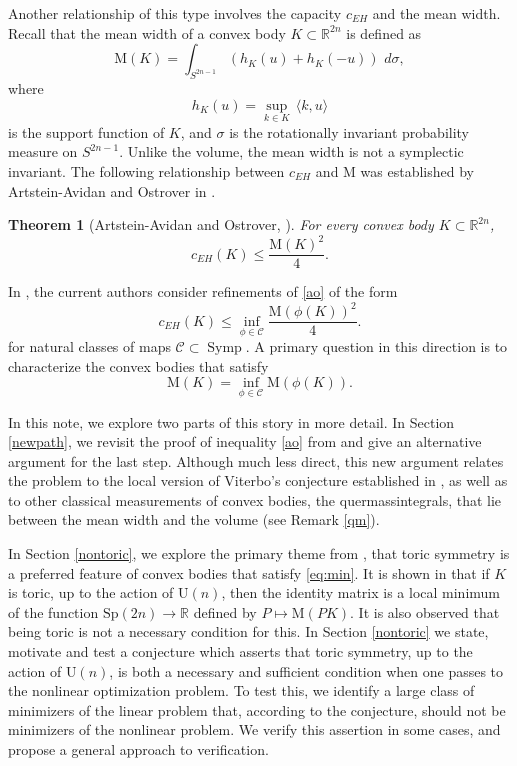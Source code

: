 \documentclass[12pt]{amsart}
\newtheorem{theorem}{Theorem}[section]
\theoremstyle{definition}
\newcommand\Symp{\operatorname{Symp}}
\newcommand{\RR}{{\mathbb R}}
\newcommand{\mw}{{{\mathrm {M}}}}
\begin{document}
Another relationship of this type involves the capacity $c_{EH}$ and the mean width. Recall that the mean width of a convex body $K \subset \RR^{2n}$ is defined as
\begin{equation*}
    \mw (K) =\int_{S^{2n-1}}( h_K(u) +  h_K(-u))\, \, d \sigma,
\end{equation*}
where
\begin{equation*}
     h_K (u) =\sup_{k \in K} \, \langle k,u \rangle
\end{equation*}
is the support function of $K$, and $\sigma$ is the rotationally invariant probability measure on $S^{2n-1}$. Unlike the volume, the mean width is not a symplectic invariant. The following relationship between $c_{EH}$ and $\mw$ was established by Artstein-Avidan and Ostrover in \cite{ao}. 
\begin{theorem}[Artstein-Avidan and Ostrover, \cite{ao}]\label{thm:ao}
    For every convex body $K \subset \RR^{2n}$, 
\begin{equation}\label{ao}
    c_{EH}(K) \leq \frac{\mw(K)^2}{4}.
\end{equation}
\end{theorem}
In \cite{ak}, the current authors consider refinements of \eqref{ao} of the form 
\begin{equation*}
    c_{EH}(K) \leq \inf_{\phi \in \mathcal{C}}\frac{\mw(\phi(K))^2}{4}.
\end{equation*}
for natural classes of maps $\mathcal{C} \subset \Symp$. A primary question in this direction is to characterize the convex bodies that satisfy
\begin{equation}\label{eq:min}\mw(K) = \inf_{\phi \in \mathcal{C}} \mw(\phi(K)).\end{equation}
 


In this note, we explore two parts of this story in more detail. In Section \ref{newpath}, we revisit the proof of inequality \eqref{ao} from \cite{ao} and give an alternative argument for the last step. Although much less direct, this new argument relates the problem to the local version of Viterbo's conjecture established in \cite{ab}, as well as to other classical measurements of convex bodies, the quermassintegrals, that lie between the mean width and the volume (see Remark \ref{qm}). 

In Section \ref{nontoric}, we explore the primary theme from \cite{ak}, that toric symmetry is a preferred feature of convex bodies that satisfy \eqref{eq:min}. It is shown in \cite{ak} that if $K$ is toric, up to the action of $\mathrm{U}(n)$, then the identity matrix is a local minimum of the function $\mathrm{Sp}(2n) \to \RR$ defined by $P \mapsto \mw(PK)$.
It is also observed that being toric is not a necessary condition for this. In Section \ref{nontoric} we state, motivate and test a conjecture which asserts that toric symmetry, up to the action of $\mathrm{U}(n)$, is both a necessary and sufficient condition when one passes to the nonlinear optimization problem. To test this, we identify a large class of minimizers of the linear problem that, according to the conjecture, should not be minimizers of the nonlinear problem. We verify this assertion in some cases, and propose a general approach to verification.
\end{document}

